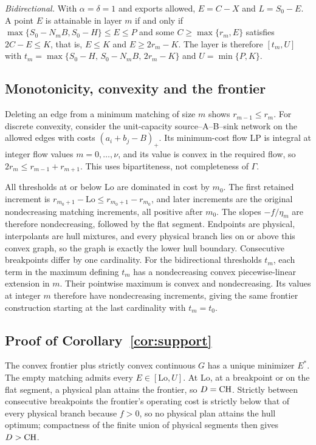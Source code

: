 \emph{Bidirectional.} With $\alpha=\delta=1$ and exports allowed, $E=C-X$ and
$L=S_0-E$. A point $E$ is attainable in layer $m$ if and only if
$\max\{S_0-N_mB,S_0-H\}\le E\le P$ and some $C\ge\max\{r_m,E\}$ satisfies
$2C-E\le K$, that is, $E\le K$ and $E\ge2r_m-K$. The layer is therefore
$[t_m,U]$ with $t_m=\max\{S_0-H,\,S_0-N_mB,\,2r_m-K\}$ and $U=\min\{P,K\}$.

\subsection{Monotonicity, convexity and the frontier}
Deleting an edge from a minimum matching of size $m$ shows $r_{m-1}\le r_m$.
For discrete convexity, consider the unit-capacity source--A--B--sink network on
the allowed edges with costs $(a_i+b_j-B)_+$. Its minimum-cost flow LP is
integral at integer flow values $m=0,\dots,\nu$, and its value is convex in the
required flow, so $2r_m\le r_{m-1}+r_{m+1}$. This uses bipartiteness, not
completeness of $\Gamma$.

All thresholds at or below $\mathrm{Lo}$ are dominated in cost by $m_0$. The first retained
increment is $r_{m_0+1}-\mathrm{Lo}\le r_{m_0+1}-r_{m_0}$, and later increments are the
original nondecreasing matching increments, all positive after $m_0$. The slopes
$-f/\eta_m$ are therefore nondecreasing, followed by the flat segment.
Endpoints are physical, interpolants are hull mixtures, and every physical
branch lies on or above this convex graph, so the graph is exactly the lower
hull boundary. Consecutive breakpoints differ by one cardinality.
For the bidirectional thresholds $t_m$, each term in the maximum defining
$t_m$ has a nondecreasing convex piecewise-linear extension in $m$. Their
pointwise maximum is convex and nondecreasing. Its values at integer $m$
therefore have nondecreasing increments, giving the same frontier construction
starting at the last cardinality with $t_m=t_0$.

\subsection{Proof of Corollary~\ref{cor:support}}
The convex frontier plus strictly convex continuous $G$ has a unique minimizer
$E^*$. The empty matching admits every $E\in[\mathrm{Lo},U]$. At
$\mathrm{Lo}$, at a breakpoint or on the flat segment, a physical plan attains
the frontier, so $D=\mathrm{CH}$. Strictly between consecutive breakpoints the frontier's
operating cost is strictly below that of every physical branch because $f>0$, so no
physical plan attains the hull optimum; compactness of the finite union of
physical segments then gives $D>\mathrm{CH}$.

